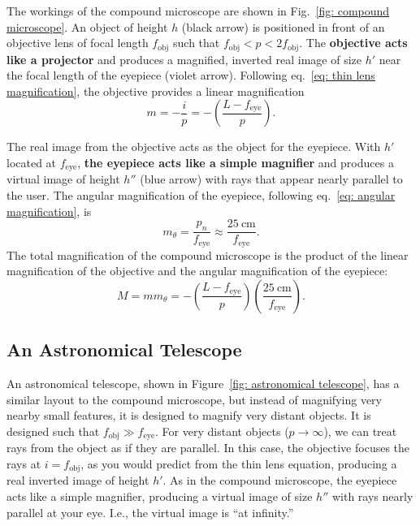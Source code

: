 \documentclass[addpoints]{physlabs}
\begin{document}
\begin{labsection}
\begin{theory}
    The workings of the compound microscope are shown in Fig.~\ref{fig: compound microscope}. An object of height $h$ (black arrow) is positioned in front of an objective lens of focal length $f_\text{obj}$ such that $f_\text{obj}<p<2f_\text{obj}$. The \textbf{objective acts like a projector} and produces a magnified, inverted real image of size $h'$ near the focal length of the eyepiece (violet arrow). Following eq.~\ref{eq: thin lens magnification}, the objective provides a linear magnification
    \[
        m = -\frac{i}{p} = -\left(\frac{L-f_\text{eye}}{p}\right).
    \]
    
    The real image from the objective acts as the object for the eyepiece. With $h'$ located at $f_\text{eye}$, \textbf{the eyepiece acts like a simple magnifier} and produces a virtual image of height $h''$ (blue arrow) with rays that appear nearly parallel to the user. The angular magnification of the eyepiece, following eq.~\ref{eq: angular magnification}, is
    \[
        m_\theta = \frac{p_n}{f_\text{eye}} \approx \frac{\qty{25}{\centi\meter}}{f_\text{eye}}.
    \]
    The total magnification of the compound microscope is the product of the linear magnification of the objective and the angular magnification of the eyepiece:
    \begin{equation}\label{eq: compound microscope}
        M = mm_\theta = -\left(\frac{L-f_\text{eye}}{p}\right)\left(\frac{\qty{25}{\centi\meter}}{f_\text{eye}}\right).
    \end{equation}

    \subsection*{An Astronomical Telescope}

    An astronomical telescope, shown in Figure~\ref{fig: astronomical telescope}, has a similar layout to the compound microscope, but instead of magnifying very nearby small features, it is designed to magnify very distant objects. It is designed such that $f_\text{obj}\gg f_\text{eye}$. For very distant objects ($p\to\infty$), we can treat rays from the object as if they are parallel. In this case, the objective focuses the rays at $i=f_\text{obj}$, as you would predict from the thin lens equation, producing a real inverted image of height $h'$. As in the compound microscope, the eyepiece acts like a simple magnifier, producing a virtual image of size $h''$ with rays nearly parallel at your eye. I.e., the virtual image is ``at infinity.''


\end{theory}
\end{labsection}
\end{document}
